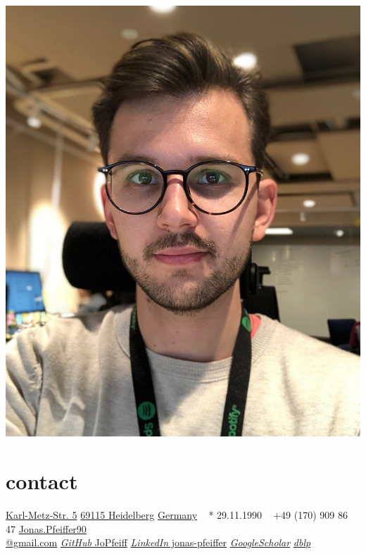 \documentclass[hidelinks]{cv-style}          %
\begin{document}
\lastupdated

\begin{aside} %

\includegraphics[width=\textwidth]{jonas_image.jpeg}

\section{contact}
\href{https://www.google.de/maps/place/Karl-Metz-Straße+5,+69115+Heidelberg/}{Karl-Metz-Str. 5}
\href{https://www.google.de/maps/place/Karl-Metz-Straße+5,+69115+Heidelberg/}{69115 Heidelberg}
\href{https://www.google.de/maps/place/Karl-Metz-Straße+5,+69115+Heidelberg/}{Germany}
~
* 29.11.1990
~
+49 (170) 909 86 47
\href{mailto:Jonas.Pfeiffer90@gmail.com}{Jonas.Pfeiffer90\\@gmail.com}
\href{https://github.com/JoPfeiff}{\emph{GitHub} JoPfeiff}
\href{https://www.linkedin.com/in/jonas-pfeiffer/}{\emph{LinkedIn} jonas-pfeiffer}
\href{https://scholar.google.com/citations?user=gGB0L4kAAAAJ}{\emph{GoogleScholar}}
\href{https://dblp.org/pers/hd/p/Pfeiffer:Jonas}{\emph{dblp}}

\end{aside}
\end{document}
